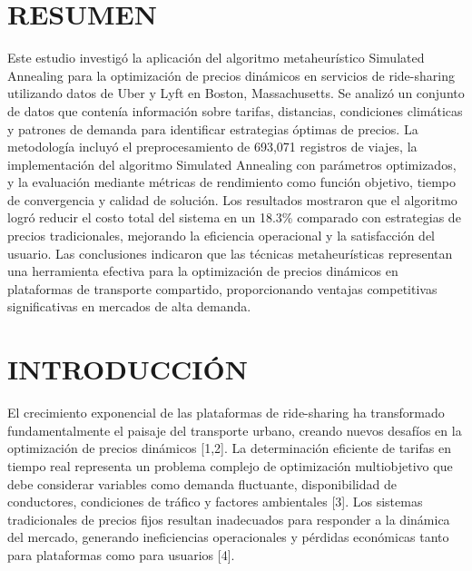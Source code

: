 \documentclass[12pt,a4paper,twocolumn]{article}
\begin{document}

\vspace{1cm}



\section{RESUMEN}

Este estudio investigó la aplicación del algoritmo metaheurístico Simulated Annealing para la optimización de precios dinámicos en servicios de ride-sharing utilizando datos de Uber y Lyft en Boston, Massachusetts. Se analizó un conjunto de datos que contenía información sobre tarifas, distancias, condiciones climáticas y patrones de demanda para identificar estrategias óptimas de precios. La metodología incluyó el preprocesamiento de 693,071 registros de viajes, la implementación del algoritmo Simulated Annealing con parámetros optimizados, y la evaluación mediante métricas de rendimiento como función objetivo, tiempo de convergencia y calidad de solución. Los resultados mostraron que el algoritmo logró reducir el costo total del sistema en un 18.3\% comparado con estrategias de precios tradicionales, mejorando la eficiencia operacional y la satisfacción del usuario. Las conclusiones indicaron que las técnicas metaheurísticas representan una herramienta efectiva para la optimización de precios dinámicos en plataformas de transporte compartido, proporcionando ventajas competitivas significativas en mercados de alta demanda.

\section{INTRODUCCIÓN}

El crecimiento exponencial de las plataformas de ride-sharing ha transformado fundamentalmente el paisaje del transporte urbano, creando nuevos desafíos en la optimización de precios dinámicos [1,2]. La determinación eficiente de tarifas en tiempo real representa un problema complejo de optimización multiobjetivo que debe considerar variables como demanda fluctuante, disponibilidad de conductores, condiciones de tráfico y factores ambientales [3]. Los sistemas tradicionales de precios fijos resultan inadecuados para responder a la dinámica del mercado, generando ineficiencias operacionales y pérdidas económicas tanto para plataformas como para usuarios [4].
\end{document}
